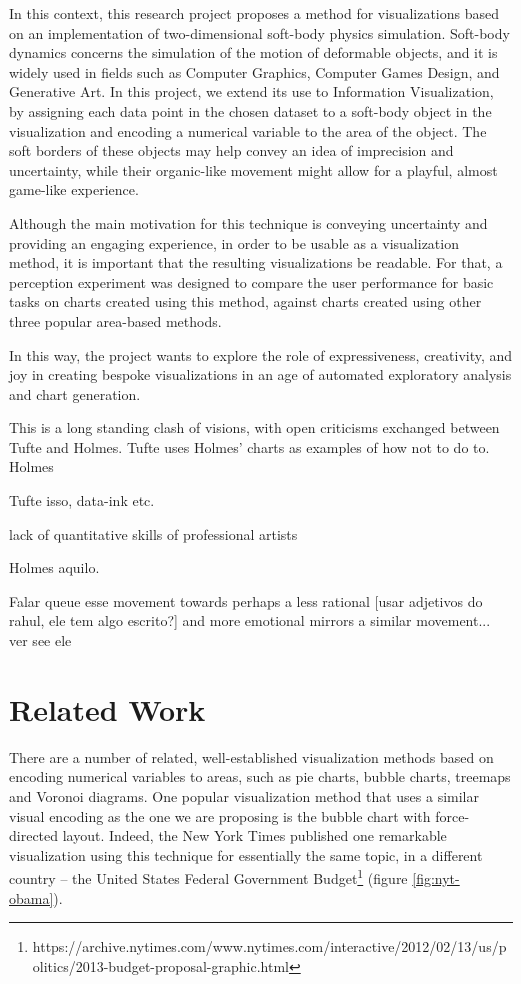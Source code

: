 \documentclass[manuscript, screen]{timtm}
\begin{document}
In this context, this research project proposes a method for visualizations based on an implementation of two-dimensional soft-body physics simulation. Soft-body dynamics concerns the simulation of the motion of deformable objects, and it is widely used in fields such as Computer Graphics, Computer Games Design, and Generative Art. In this project, we extend its use to Information Visualization, by assigning each data point in the chosen dataset to a soft-body object in the visualization and encoding a numerical variable to the area of the object. The soft borders of these objects may help convey an idea of imprecision and uncertainty, while their organic-like movement might allow for a playful, almost game-like experience.

Although the main motivation for this technique is conveying uncertainty and providing an engaging experience, in order to be usable as a visualization method, it is important that the resulting visualizations be readable. For that, a perception experiment was designed to compare the user performance for basic tasks on charts created using this method, against charts created using other three popular area-based methods.

In this way, the project wants to explore the role of expressiveness, creativity, and joy in creating bespoke visualizations in an age of automated exploratory analysis and chart generation.

This is a long standing clash of visions, with open criticisms exchanged between Tufte and Holmes. Tufte uses Holmes' charts as examples of how not to do to. Holmes

Tufte isso, data-ink etc.

lack of quantitative skills of professional artists

Holmes aquilo.

Falar queue esse movement towards perhaps a less rational [usar adjetivos do rahul, ele tem algo escrito?] and more emotional mirrors a similar movement... ver see ele

\section{Related Work}

There are a number of related, well-established visualization methods based on encoding numerical variables to areas, such as pie charts, bubble charts, treemaps and Voronoi diagrams. One popular visualization method that uses a similar visual encoding as the one we are proposing is the bubble chart with force-directed layout. Indeed, the New York Times published one remarkable visualization using this technique for essentially the same topic, in a different country – the United States Federal Government Budget\footnote{https://archive.nytimes.com/www.nytimes.com/interactive/2012/02/13/us/politics/2013-budget-proposal-graphic.html} (figure \ref{fig:nyt-obama}).
\end{document}
